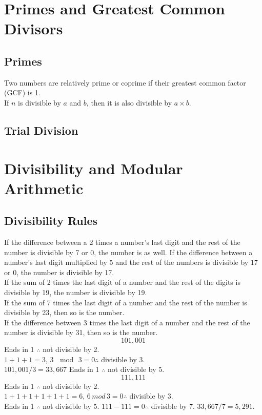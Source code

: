 \documentclass[./Discrete Math.tex]{subfiles}
\begin{document}
	\section{Primes and Greatest Common Divisors}
		\setcounter{subsection}{1}
		\subsection{Primes}
			Two numbers are relatively prime or coprime if their greatest common factor (GCF) is 1. \\
			If \(n\) is divisible by \(a\) and \(b\), then it is also divisible by \(a \times b\).
		\subsection{Trial Division}
	\setcounter{section}{0}
	\section{Divisibility and Modular Arithmetic}
		\subsection*{Divisibility Rules}
			If the difference between a 2 times a number's last digit and the rest of the number is divisible by 7 or 0, the number is as well.
			If the difference between a number's last digit multiplied by 5 and the rest of the numbers is divisible by 17 or 0, the number is divisible by 17. \\
			If the sum of 2 times the last digit of a number and the rest of the digits is divisible by 19, the number is divisible by 19. \\
			If the sum of 7 times the last digit of a number and the rest of the number is divisible by 23, then so is the number. \\
			If the difference between 3 times the last digit of a number and the rest of the number is divisible by 31, then so is the number.
			\[101,001\]
			Ends in 1 \(\therefore\) not divisible by 2. \\
			\(1 + 1 + 1 = 3\), \(3 \,\mod\, 3 = 0 \therefore\) divisible by 3. \\
			\(101,001 / 3 = 33,667\)
			Ends in 1 \(\therefore\) not divisible by 5. \\
			\[111,111\]
			Ends in 1 \(\therefore\) not divisible by 2. \\
			\(1 + 1 + 1 + 1 + 1 + 1 = 6\), \(6\,mod\,3 = 0 \therefore\) divisible by 3. \\
			Ends in 1 \(\therefore\) not divisible by 5.
			\(111 - 111 = 0 \therefore\) divisible by 7.
			\(33,667 / 7 = 5,291\).
\end{document}
